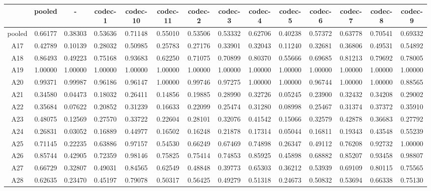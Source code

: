 \begin{tabular}{cccccccccccccc}
\toprule
       &  pooled  &    -     & codec-1  & codec-10 & codec-11 & codec-2  & codec-3  & codec-4  & codec-5  & codec-6  & codec-7  & codec-8  & codec-9 \\ 
\midrule
pooled &  0.66177 &  0.38303 &  0.53636 &  0.71148 &  0.55010 &  0.53506 &  0.53332 &  0.62706 &  0.40238 &  0.57372 &  0.63778 &  0.70541 &  0.69332\\ 
 A17   &  0.42789 &  0.10139 &  0.28032 &  0.50985 &  0.25783 &  0.27176 &  0.33901 &  0.32043 &  0.11240 &  0.32681 &  0.36806 &  0.49531 &  0.54892\\ 
 A18   &  0.86493 &  0.49223 &  0.75168 &  0.93683 &  0.62250 &  0.71075 &  0.70899 &  0.80370 &  0.55666 &  0.69685 &  0.81213 &  0.79692 &  0.78005\\ 
 A19   &  1.00000 &  1.00000 &  1.00000 &  1.00000 &  1.00000 &  1.00000 &  1.00000 &  1.00000 &  1.00000 &  1.00000 &  1.00000 &  1.00000 &  1.00000\\ 
 A20   &  0.99371 &  0.99987 &  0.96186 &  0.96147 &  1.00000 &  0.99746 &  0.97275 &  1.00000 &  1.00000 &  0.96744 &  1.00000 &  1.00000 &  0.88565\\ 
 A21   &  0.34580 &  0.04473 &  0.18032 &  0.26411 &  0.14856 &  0.19885 &  0.28990 &  0.32726 &  0.05245 &  0.23900 &  0.32432 &  0.34208 &  0.29002\\ 
 A22   &  0.35684 &  0.07622 &  0.20852 &  0.31239 &  0.16633 &  0.22099 &  0.25474 &  0.31280 &  0.08998 &  0.25467 &  0.31374 &  0.37372 &  0.35910\\ 
 A23   &  0.48075 &  0.12569 &  0.27570 &  0.33722 &  0.22604 &  0.28101 &  0.32076 &  0.41542 &  0.15066 &  0.32579 &  0.42878 &  0.36683 &  0.27792\\ 
 A24   &  0.26831 &  0.03052 &  0.16889 &  0.44977 &  0.16502 &  0.16248 &  0.21878 &  0.17314 &  0.05044 &  0.16811 &  0.19343 &  0.43548 &  0.55239\\ 
 A25   &  0.71145 &  0.22235 &  0.63886 &  0.97157 &  0.54530 &  0.66249 &  0.67469 &  0.74898 &  0.26347 &  0.49112 &  0.76208 &  0.92732 &  1.00000\\ 
 A26   &  0.85744 &  0.42905 &  0.72359 &  0.98146 &  0.75825 &  0.75414 &  0.74853 &  0.85925 &  0.45898 &  0.68882 &  0.85207 &  0.93458 &  0.98807\\ 
 A27   &  0.66729 &  0.32807 &  0.49031 &  0.84565 &  0.62549 &  0.48848 &  0.39773 &  0.65303 &  0.36212 &  0.53939 &  0.69109 &  0.80115 &  0.75565\\ 
 A28   &  0.62635 &  0.23470 &  0.45197 &  0.79078 &  0.50317 &  0.56425 &  0.49279 &  0.51318 &  0.24673 &  0.50832 &  0.53694 &  0.66338 &  0.75130\\ 

\end{tabular}
